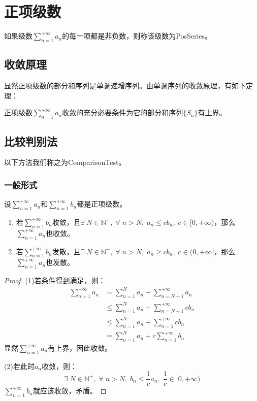 \section{正项级数}

\begin{definition}
	如果级数$\sum\limits_{n=1}^{+\infty}a_n$的每一项都是非负数，则称该级数为\gls{PosSeries}。
\end{definition}

\subsection{收敛原理}
显然正项级数的部分和序列是单调递增序列。由单调序列的收敛原理，有如下定理：
\begin{theorem}
	正项级数$\sum\limits_{n=1}^{+\infty}a_n$收敛的充分必要条件为它的部分和序列$\{S_n\}$有上界。
\end{theorem}

\subsection{比较判别法}
以下方法我们称之为\gls{ComparisonTest}。
\subsubsection{一般形式}
\begin{theorem}
	设$\sum\limits_{n=1}^{+\infty}a_n$和$\sum\limits_{n=1}^{+\infty}b_n$都是正项级数。
	\begin{enumerate}
		\item 若$\sum\limits_{n=1}^{+\infty}b_n$收敛，且$\exists\;N\in\mathbb{N}^+,\;\forall\;n>N,\;a_n\leqslant cb_n,\;c\in[0,+\infty)$，那么$\sum\limits_{n=1}^{+\infty}a_n$也收敛。
		\item 若$\sum\limits_{n=1}^{+\infty}b_n$发散，且$\exists\;N\in\mathbb{N}^+,\;\forall\;n>N,\;a_n\geqslant cb_n,\;c\in(0,+\infty]$，那么$\sum\limits_{n=1}^{+\infty}a_n$也发散。
	\end{enumerate}
\end{theorem}
\begin{proof}
	(1)若条件得到满足，则：
	\begin{align*}
		\sum_{n=1}^{+\infty}a_n&=\sum_{n=1}^Na_n+\sum_{n=N+1}^{+\infty}a_n \\
		&\leqslant\sum_{n=1}^Na_n+\sum_{n=N+1}^{+\infty}cb_n \\
		&\leqslant\sum_{n=1}^Na_n+\sum_{n=1}^{+\infty}cb_n \\
		&=\sum_{n=1}^Na_n+c\sum_{n=1}^{+\infty}b_n
	\end{align*}
	显然$\sum\limits_{n=1}^{+\infty}a_n$有上界，因此收敛。\par
	(2)若此时$a_n$收敛，则：
	\begin{equation*}
		\exists\;N\in\mathbb{N}^+,\;\forall\;n>N,\;b_n\leqslant\frac{1}{c}a_n,\;\frac{1}{c}\in[0,+\infty)
	\end{equation*}
	$\sum\limits_{n=1}^{+\infty}b_n$就应该收敛，矛盾。
\end{proof}
